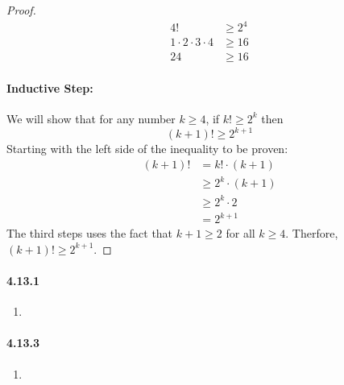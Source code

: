 \documentclass[11pt, letterpaper, twocolumn, fleqn]{article}
\begin{document}
\begin{enumerate}
\begin{proof}
              \begin{align*}
                4! &\geq 2^4 \\
                1\cdot2\cdot3\cdot4 &\geq 16 \\
                24 &\geq 16
              \end{align*}
              \item \paragraph{Inductive Step:} We will show that for any number $k\geq4$, if $k! \geq 2^k$ then 
                $$(k+1)! \geq 2^{k+1}$$
              Starting with the left side of the inequality to be proven:
              \begin{align*}
                (k+1)! &= k! \cdot (k+1) \\
                &\geq 2^k \cdot (k+1) \tag{inductive hypothesis}\\
                &\geq 2^k \cdot 2 \\
                &= 2^{k+1}
              \end{align*}
              The third steps uses the fact that $k+1 \geq 2$ for all $k \geq 4$. Therfore, $(k+1)! \geq 2^{k+1}$.
            \end{proof}

        \end{enumerate}
    
    \paragraph{4.13.1}
        \begin{enumerate}
            \item 
        \end{enumerate}
    
    \paragraph{4.13.3}
        \begin{enumerate}
            \item 
        \end{enumerate}
\end{document}
